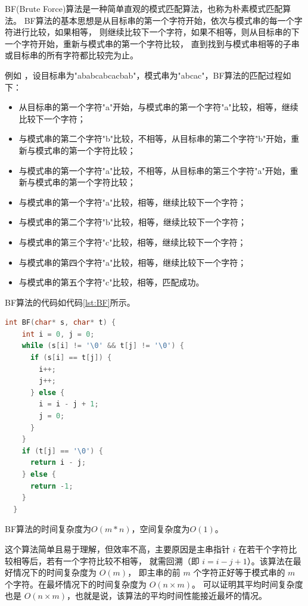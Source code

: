 \documentclass[lang=cn,newtx,10pt,scheme=chinese]{elegantbook}
\begin{document}
BF(Brute Force)算法是一种简单直观的模式匹配算法，也称为朴素模式匹配算法。
BF算法的基本思想是从目标串的第一个字符开始，依次与模式串的每一个字符进行比较，如果相等，
则继续比较下一个字符，如果不相等，则从目标串的下一个字符开始，重新与模式串的第一个字符比较，
直到找到与模式串相等的子串或目标串的所有字符都比较完为止。

例如 ，设目标串为"ababcabcacbab"，模式串为"abcac"，BF算法的匹配过程如下：

\begin{itemize}
  \item 从目标串的第一个字符"a"开始，与模式串的第一个字符"a"比较，相等，继续比较下一个字符；
  \item 与模式串的第二个字符"b"比较，不相等，从目标串的第二个字符"b"开始，重新与模式串的第一个字符比较；
  \item 与模式串的第一个字符"a"比较，不相等，从目标串的第三个字符"a"开始，重新与模式串的第一个字符比较；
  \item 与模式串的第一个字符"a"比较，相等，继续比较下一个字符；
  \item 与模式串的第二个字符"b"比较，相等，继续比较下一个字符；
  \item 与模式串的第三个字符"c"比较，相等，继续比较下一个字符；
  \item 与模式串的第四个字符"a"比较，相等，继续比较下一个字符；
  \item 与模式串的第五个字符"c"比较，相等，匹配成功。
\end{itemize}

BF算法的代码如代码\ref{lst:BF}所示。

\begin{lstlisting}[language=C++, caption={BF算法示例代码}, label={lst:BF}]
  int BF(char* s, char* t) {
    int i = 0, j = 0;
    while (s[i] != '\0' && t[j] != '\0') {
      if (s[i] == t[j]) {
        i++;
        j++;
      } else {
        i = i - j + 1;
        j = 0;
      }
    }
    if (t[j] == '\0') {
      return i - j;
    } else {
      return -1;
    }
  }

\end{lstlisting}

BF算法的时间复杂度为$O(m*n)$，空间复杂度为$O(1)$。

这个算法简单且易于理解，但效率不高，主要原因是主串指针 $i$ 在若干个字符比较相等后，若有一个字符比较不相等，
就需回溯（即 $i = i - j + 1$）。该算法在最好情况下的时间复杂度为 $O(m)$，
即主串的前 $m$ 个字符正好等于模式串的 $m$ 个字符。在最坏情况下的时间复杂度为 $O(n \times m)$。
可以证明其平均时间复杂度也是 $O(n \times m)$，也就是说，该算法的平均时间性能接近最坏的情况。
\end{document}
